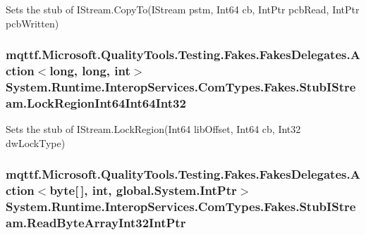 Sets the stub of I\-Stream.\-Copy\-To(\-I\-Stream pstm, Int64 cb, Int\-Ptr pcb\-Read, Int\-Ptr pcb\-Written)

\hypertarget{class_system_1_1_runtime_1_1_interop_services_1_1_com_types_1_1_fakes_1_1_stub_i_stream_a9f5cc0a9fa7c3f8c31cf752211fdaf1a}{
\subsubsection[{Lock\-Region\-Int64\-Int64\-Int32}]{\setlength{\rightskip}{0pt plus 5cm}mqttf.\-Microsoft.\-Quality\-Tools.\-Testing.\-Fakes.\-Fakes\-Delegates.\-Action$<$long, long, int$>$ System.\-Runtime.\-Interop\-Services.\-Com\-Types.\-Fakes.\-Stub\-I\-Stream.\-Lock\-Region\-Int64\-Int64\-Int32}}\label{class_system_1_1_runtime_1_1_interop_services_1_1_com_types_1_1_fakes_1_1_stub_i_stream_a9f5cc0a9fa7c3f8c31cf752211fdaf1a}


Sets the stub of I\-Stream.\-Lock\-Region(\-Int64 lib\-Offset, Int64 cb, Int32 dw\-Lock\-Type)

\hypertarget{class_system_1_1_runtime_1_1_interop_services_1_1_com_types_1_1_fakes_1_1_stub_i_stream_ac75b948ce5d47ffd4ccf9ce5a74eb9ba}{
\subsubsection[{Read\-Byte\-Array\-Int32\-Int\-Ptr}]{\setlength{\rightskip}{0pt plus 5cm}mqttf.\-Microsoft.\-Quality\-Tools.\-Testing.\-Fakes.\-Fakes\-Delegates.\-Action$<$byte\mbox{[}$\,$\mbox{]}, int, global.\-System.\-Int\-Ptr$>$ System.\-Runtime.\-Interop\-Services.\-Com\-Types.\-Fakes.\-Stub\-I\-Stream.\-Read\-Byte\-Array\-Int32\-Int\-Ptr}}\label{class_system_1_1_runtime_1_1_interop_services_1_1_com_types_1_1_fakes_1_1_stub_i_stream_ac75b948ce5d47ffd4ccf9ce5a74eb9ba}


